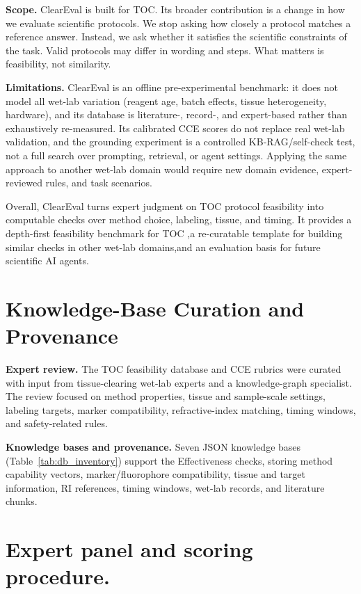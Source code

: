 \documentclass[conference]{IEEEtran}
\begin{document}
\noindent\textbf{Scope.}
ClearEval is built for TOC. Its broader contribution is a change in how 
we evaluate scientific protocols. We stop asking how closely a protocol 
matches a reference answer. Instead, we ask whether it satisfies the scientific 
constraints of the task. Valid protocols may differ in wording and steps. 
What matters is feasibility, not similarity.

\noindent\textbf{Limitations.}
ClearEval is an offline pre-experimental benchmark: it does not model all
wet-lab variation (reagent age, batch effects, tissue heterogeneity, hardware),
and its database is literature-, record-, and expert-based rather than
exhaustively re-measured. Its calibrated CCE scores do not replace real wet-lab
validation, and the grounding experiment is a controlled KB-RAG/self-check test,
not a full search over prompting, retrieval, or agent settings. Applying the same approach
to another wet-lab domain would require new domain evidence, expert-reviewed
rules, and task scenarios. 

Overall, ClearEval turns expert judgment on TOC protocol feasibility into
computable checks over method choice, labeling, tissue, and timing. It
provides a depth-first feasibility benchmark for TOC ,a re-curatable template
for building similar checks in other wet-lab domains,and an evaluation basis
for future scientific AI agents.

\appendices
\section{Knowledge-Base Curation and Provenance}\label{app:curation}

\noindent\textbf{Expert review.}
The TOC feasibility database and CCE rubrics were curated with input from
tissue-clearing wet-lab experts and a knowledge-graph specialist. The review
focused on method properties, tissue and sample-scale settings, labeling
targets, marker compatibility, refractive-index matching, timing windows, and
safety-related rules.

\noindent\textbf{Knowledge bases and provenance.}
Seven JSON knowledge bases (Table~\ref{tab:db_inventory}) support the
Effectiveness checks, storing method capability vectors, marker/fluorophore
compatibility, tissue and target information, RI references, timing windows,
wet-lab records, and literature chunks. 

\section{Expert panel and scoring procedure.}\label{app:judge}
\end{document}
